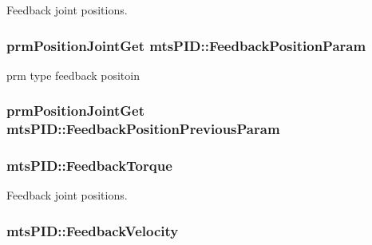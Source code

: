 Feedback joint positions. 

\hypertarget{classmts_p_i_d_ab504e84dce2591651f13dde667e34497}{}
\subsubsection[{Feedback\+Position\+Param}]{\setlength{\rightskip}{0pt plus 5cm}prm\+Position\+Joint\+Get mts\+P\+I\+D\+::\+Feedback\+Position\+Param\hspace{0.3cm}{\ttfamily [protected]}}\label{classmts_p_i_d_ab504e84dce2591651f13dde667e34497}


prm type feedback positoin 

\hypertarget{classmts_p_i_d_a28b48c75d2a18ae085e903a4d2668527}{}
\subsubsection[{Feedback\+Position\+Previous\+Param}]{\setlength{\rightskip}{0pt plus 5cm}prm\+Position\+Joint\+Get mts\+P\+I\+D\+::\+Feedback\+Position\+Previous\+Param\hspace{0.3cm}{\ttfamily [protected]}}\label{classmts_p_i_d_a28b48c75d2a18ae085e903a4d2668527}
\hypertarget{classmts_p_i_d_a70a6622da968b22d790eebbbfa584c26}{}
\subsubsection[{Feedback\+Torque}]{ mts\+P\+I\+D\+::\+Feedback\+Torque\hspace{0.3cm}{\ttfamily [protected]}}\label{classmts_p_i_d_a70a6622da968b22d790eebbbfa584c26}


Feedback joint positions. 

\hypertarget{classmts_p_i_d_ad881aba30dc205f26ce1ce69763bf9a6}{}
\subsubsection[{Feedback\+Velocity}]{ mts\+P\+I\+D\+::\+Feedback\+Velocity\hspace{0.3cm}{\ttfamily [protected]}}\label{classmts_p_i_d_ad881aba30dc205f26ce1ce69763bf9a6}


